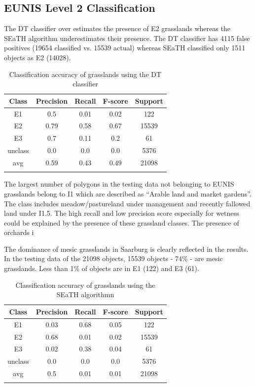 \documentclass[authoryear, review,12pt,number]{elsarticle}
\begin{document}
{\subsection{EUNIS Level 2 Classification}
\label{level2_classification}
The DT classifier over estimates the presence of E2 grasslands whereas the SEaTH
algorithm underestimates their presence. The DT classifier has 4115 false
positives (19654 classified vs. 15539 actual) whereas SEaTH classified only 1511
objects as E2 (14028). 
\begin{table}
\begin{tabular}{c c c c c}
Class & Precision & Recall & F-score & Support\\
\hline
E1 & 0.5 & 0.01 & 0.02 & 122\\
E2 & 0.79 & 0.58 & 0.67 & 15539\\
E3 & 0.7 & 0.11 & 0.2 & 61\\
unclass & 0.0 & 0.0 & 0.0 & 5376\\
avg & 0.59 & 0.43 & 0.49 & 21098\\
\label{fig:dt_lvl2_classification}
\end{tabular}
\caption{Classification accuracy of grasslands using the DT classifier}
\end{table}
The largest number of polygons in the testing data not belonging to EUNIS
grasslands belong to I1 which are described as ``Arable land and
market gardens''. The class includes meadow/pastureland under management and
recently fallowed land under I1.5. The high recall and low precision score
especially for wetness could be explained by the presence of these grassland
classes. The presence of orchards i 

The dominance of mesic grasslands in Saarburg is clearly reflected in
the results. In the testing data of the 21098 objects, 15539 objects - 74\% -
are mesic grasslands. Less than 1\% of objects are in E1 (122) and E3 (61). 
\begin{table}
\centering
\begin{tabular}{c c c c c}
Class & Precision & Recall & F-score & Support\\
\hline
E1 & 0.03 & 0.68 & 0.05 & 122\\
E2 & 0.68 & 0.01 & 0.02 & 15539\\
E3 & 0.02 & 0.38 & 0.04 & 61\\
unclass & 0.0 & 0.0 & 0.0 & 5376\\
avg & 0.5 & 0.01 & 0.01 & 21098\\
\label{fig:seath_lvl2_classification}
\end{tabular}
\caption{Classification accuracy of grasslands using the SEaTH algorithmn}
\end{table}

}
\end{document}
